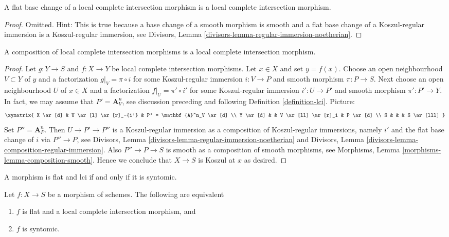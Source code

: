 \begin{lemma}
\label{lemma-flat-base-change-lci}
A flat base change of a local complete intersection morphism is a
local complete intersection morphism.
\end{lemma}

\begin{proof}
Omitted. Hint: This is true because a base change of a smooth morphism
is smooth and a flat base change of a Koszul-regular immersion is a
Koszul-regular immersion, see
Divisors, Lemma \ref{divisors-lemma-regular-immersion-noetherian}.
\end{proof}

\begin{lemma}
\label{lemma-composition-lci}
A composition of local complete intersection morphisms
is a local complete intersection morphism.
\end{lemma}

\begin{proof}
Let $g : Y \to S$ and $f : X \to Y$ be local complete intersection
morphisms. Let $x \in X$ and set $y = f(x)$. Choose an open neighbourhood
$V \subset Y$ of $y$ and a factorization $g|_V = \pi \circ i$ for some
Koszul-regular immersion $i : V \to P$ and smooth morphism $\pi : P \to S$.
Next choose an open neighbourhood $U$ of $x \in X$ and a factorization
$f|_U = \pi' \circ i'$ for some Koszul-regular immersion $i' : U \to P'$
and smooth morphism $\pi' : P' \to Y$. In fact, we may assume that
$P' = \mathbf{A}^n_V$, see discussion preceding and following
Definition \ref{definition-lci}. Picture:
$$
\xymatrix{
X \ar[d] & U \ar[l] \ar[r]_-{i'} & P' = \mathbf{A}^n_V \ar[d] \\
Y \ar[d] &  & V \ar[ll] \ar[r]_i & P \ar[d] \\
S & & & S \ar[lll]
}
$$
Set $P'' = \mathbf{A}^n_P$. Then $U \to P' \to P''$ is a
Koszul-regular immersion as a composition
of Koszul-regular immersions, namely $i'$ and the flat base change of
$i$ via $P'' \to P$, see
Divisors,
Lemma \ref{divisors-lemma-regular-immersion-noetherian}
and
Divisors, Lemma \ref{divisors-lemma-composition-regular-immersion}.
Also $P'' \to P \to S$ is smooth as a composition of smooth morphisms,
see
Morphisms, Lemma \ref{morphisms-lemma-composition-smooth}.
Hence we conclude that $X \to S$ is Koszul at $x$ as desired.
\end{proof}

\begin{lemma}
\label{lemma-flat-lci}
\begin{slogan}
A morphism is flat and lci if and only if it is syntomic.
\end{slogan}
Let $f : X \to S$ be a morphism of schemes.
The following are equivalent
\begin{enumerate}
\item $f$ is flat and a local complete intersection morphism, and
\item $f$ is syntomic.
\end{enumerate}
\end{lemma}

